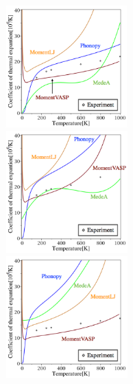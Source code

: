 \documentclass[10pt,twocolumn,a4j]{jsarticle}
\begin{document}
\begin{figure}[htb]
\begin{minipage}{0.245\hsize}
\begin{center}
\includegraphics[width=4.7cm]{./image_result/Cu_TEcoeff_label.eps}
\end{center}
\end{minipage}
\begin{minipage}{0.245\hsize}
\begin{center}
\includegraphics[width=4.7cm]{./image_result/Ag_TEcoeff_label.eps}
\end{center}
\end{minipage}
 \begin{minipage}{0.245\hsize}
\begin{center}
\includegraphics[width=4.7cm]{./image_result/Au_TEcoeff_label.eps}
\end{center}
\end{minipage}
 \begin{minipage}{0.245\hsize}
\begin{center}

\end{center}
\end{minipage}
\end{figure}
\end{document}
